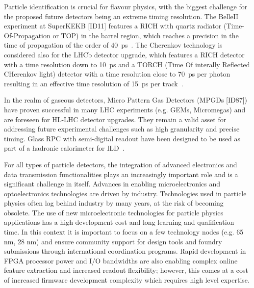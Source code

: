 Particle identification is crucial for flavour physics, with the biggest challenge for the proposed future detectors being an extreme timing resolution.
The BelleII experiment at SuperKEKB [ID11] features a RICH with quartz radiator (Time-Of-Propagation or TOP) in the barrel region, which reaches a precision in the time of propagation of the order of 40~ps~\cite{Abe:2010gxa}. 
The Cherenkov technology is considered also for the LHCb detector upgrade, which features a RICH detector with a time resolution down to 10~ps and a TORCH (Time Of interally Reflected
CHerenkov light) detector with a time resolution close to 70~ps per photon resulting in an effective time resolution of 15~ps per track~\cite{Aaij:2244311}.

In the realm of gaseous detectors, Micro Pattern Gas Detectors (MPGDs [ID87]) have proven successful in many LHC experiments (e.g. GEMs, Micromegas) and are foreseen for HL-LHC detector upgrades. They remain a valid asset for addressing future experimental challenges such as high granularity and precise timing.
Glass RPC with semi-digital readout have been designed to be used as part of a hadronic calorimeter for ILD~\cite{Grenier_2014}.

For all types of particle detectors, the integration of advanced electronics and data transmission functionalities plays an increasingly important role and is a significant challenge in itself. Advances in enabling microelectronics and optoelectronics technologies are driven by industry.  Technologies used in particle physics often lag behind industry by many years, at the risk of becoming obsolete.  
The use of new microelectronic technologies for particle physics applications has a high development cost and long learning and qualification time. In this context it is important to focus on a few technology nodes (e.g. 65 nm, 28 nm) and ensure community support for design tools and foundry submissions through international coordination programs. 
Rapid development in FPGA processor power and I/O bandwidths are also enabling complex online feature extraction and increased readout flexibility; however, this comes at a cost of increased firmware development complexity which requires high level expertise.

